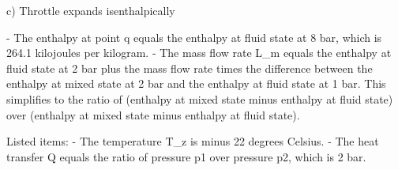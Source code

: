 c) Throttle expands isenthalpically

- The enthalpy at point q equals the enthalpy at fluid state at 8 bar, which is 264.1 kilojoules per kilogram.
- The mass flow rate L_m equals the enthalpy at fluid state at 2 bar plus the mass flow rate times the difference between the enthalpy at mixed state at 2 bar and the enthalpy at fluid state at 1 bar. This simplifies to the ratio of (enthalpy at mixed state minus enthalpy at fluid state) over (enthalpy at mixed state minus enthalpy at fluid state).

Listed items:
- The temperature T_z is minus 22 degrees Celsius.
- The heat transfer Q equals the ratio of pressure p1 over pressure p2, which is 2 bar.